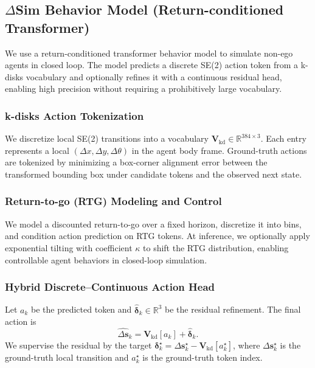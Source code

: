 \documentclass{article}
\theoremstyle{plain}
\theoremstyle{definition}
\theoremstyle{remark}
\begin{document}
\subsection{\(\Delta\)Sim Behavior Model (Return-conditioned Transformer)}
\label{app:deltasim}

We use a return-conditioned transformer behavior model to simulate non-ego agents in closed loop. The model predicts a discrete SE(2)
action token from a k-disks vocabulary and optionally refines it with a continuous residual head, enabling high precision without requiring
a prohibitively large vocabulary.

\subsubsection{k-disks Action Tokenization}

We discretize local SE(2) transitions into a vocabulary \(\mathbf{V}_{\mathrm{kd}}\in\mathbb{R}^{384\times 3}\). Each entry represents
a local \((\Delta x,\Delta y,\Delta\theta)\) in the agent body frame. Ground-truth actions are tokenized by minimizing a box-corner
alignment error between the transformed bounding box under candidate tokens and the observed next state.

\subsubsection{Return-to-go (RTG) Modeling and Control}

We model a discounted return-to-go over a fixed horizon, discretize it into bins, and condition action prediction on RTG tokens.
At inference, we optionally apply exponential tilting with coefficient \(\kappa\) to shift the RTG distribution, enabling controllable
agent behaviors in closed-loop simulation.

\subsubsection{Hybrid Discrete--Continuous Action Head}

Let \(a_k\) be the predicted token and \(\widehat{\boldsymbol{\delta}}_k\in\mathbb{R}^3\) be the residual refinement.
The final action is
\[
\widehat{\Delta\mathbf{s}}_k = \mathbf{V}_{\mathrm{kd}}[a_k] + \widehat{\boldsymbol{\delta}}_k.
\]
We supervise the residual by the target \(\boldsymbol{\delta}^{\star}_k = \Delta\mathbf{s}^{\star}_k - \mathbf{V}_{\mathrm{kd}}[a_k^{\star}]\),
where \(\Delta\mathbf{s}^{\star}_k\) is the ground-truth local transition and \(a_k^{\star}\) is the ground-truth token index.
\end{document}
